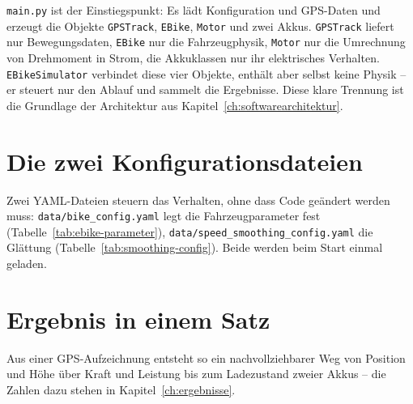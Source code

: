 \texttt{main.py} ist der Einstiegspunkt: Es lädt Konfiguration und GPS-Daten und erzeugt die Objekte \texttt{GPSTrack}, \texttt{EBike}, \texttt{Motor} und zwei Akkus. \texttt{GPSTrack} liefert nur Bewegungsdaten, \texttt{EBike} nur die Fahrzeugphysik, \texttt{Motor} nur die Umrechnung von Drehmoment in Strom, die Akkuklassen nur ihr elektrisches Verhalten. \texttt{EBikeSimulator} verbindet diese vier Objekte, enthält aber selbst keine Physik -- er steuert nur den Ablauf und sammelt die Ergebnisse. Diese klare Trennung ist die Grundlage der Architektur aus Kapitel~\ref{ch:softwarearchitektur}.

\section{Die zwei Konfigurationsdateien}

Zwei YAML-Dateien steuern das Verhalten, ohne dass Code geändert werden muss: \texttt{data/bike\_config.yaml} legt die Fahrzeugparameter fest (Tabelle~\ref{tab:ebike-parameter}), \texttt{data/speed\_smoothing\_config.yaml} die Glättung (Tabelle~\ref{tab:smoothing-config}). Beide werden beim Start einmal geladen.

\section{Ergebnis in einem Satz}

Aus einer GPS-Aufzeichnung entsteht so ein nachvollziehbarer Weg von Position und Höhe über Kraft und Leistung bis zum Ladezustand zweier Akkus -- die Zahlen dazu stehen in Kapitel~\ref{ch:ergebnisse}.
